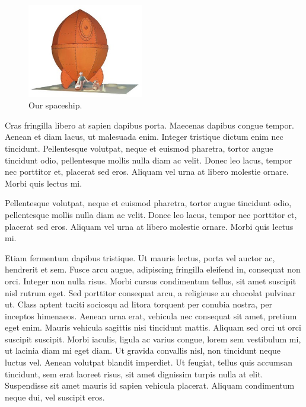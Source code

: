 \documentclass[final,12pt]{article}
\begin{document}
\begin{figure}[h]
\begin{center}
\includegraphics[width=0.45\textwidth]{figures/wallace+and+gromit+rocket+papercraft.jpg}
\caption{Our spaceship.}\label{fig:spaceship}       %
\end{center}
\end{figure}

Cras fringilla libero at sapien dapibus
porta. Maecenas dapibus congue tempor. Aenean et diam lacus, ut
malesuada enim. Integer tristique dictum enim nec
tincidunt. Pellentesque volutpat, neque et euismod pharetra, tortor
augue tincidunt odio, pellentesque mollis nulla diam ac velit. Donec
leo lacus, tempor nec porttitor et, placerat sed eros. Aliquam vel
urna at libero molestie ornare. Morbi quis lectus mi.

Pellentesque volutpat, neque et euismod pharetra, tortor
augue tincidunt odio, pellentesque mollis nulla diam ac velit. Donec
leo lacus, tempor nec porttitor et, placerat sed eros. Aliquam vel
urna at libero molestie ornare. Morbi quis lectus mi.

Etiam fermentum dapibus tristique. Ut mauris lectus, porta vel auctor
ac, hendrerit et sem. Fusce arcu augue, adipiscing fringilla eleifend
in, consequat non orci. Integer non nulla risus. Morbi cursus
condimentum tellus, sit amet suscipit nisl rutrum eget. Sed porttitor
consequat arcu, a religieuse au chocolat pulvinar ut. Class aptent taciti
sociosqu ad litora torquent per conubia nostra, per inceptos
himenaeos. Aenean urna erat, vehicula nec consequat sit amet, pretium
eget enim. Mauris vehicula sagittis nisi tincidunt mattis. Aliquam sed
orci ut orci suscipit suscipit. Morbi iaculis, ligula ac varius
congue, lorem sem vestibulum mi, ut lacinia diam mi eget diam. Ut
gravida convallis nisl, non tincidunt neque luctus vel. Aenean
volutpat blandit imperdiet. Ut feugiat, tellus quis accumsan
tincidunt, sem erat laoreet risus, sit amet dignissim turpis nulla at
elit. Suspendisse sit amet mauris id sapien vehicula placerat. Aliquam
condimentum neque dui, vel suscipit eros.
\end{document}
